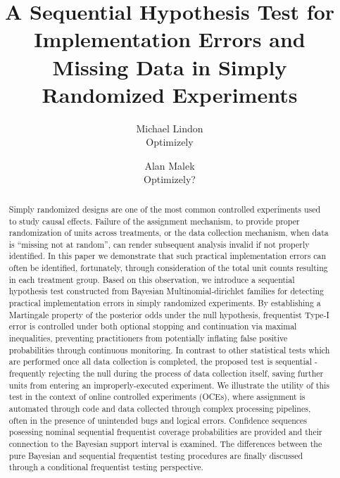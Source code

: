 \documentclass[11pt]{article}
\begin{document}
\vspace{-1in}
\title{A Sequential Hypothesis Test for Implementation Errors and Missing Data in Simply Randomized Experiments}
\author{\Large Michael Lindon \\ Optimizely \and Alan Malek \\ Optimizely?}
\maketitle 
\begin{abstract}
  Simply randomized designs are one of the most common controlled experiments used to study causal effects.
  Failure of the assignment mechanism, to provide proper randomization of units across treatments, or the data collection mechanism, when data is ``missing not at random'', can render subsequent analysis invalid if not properly identified. In this paper we demonstrate that such practical implementation errors can often be identified, fortunately, through consideration of the total unit counts resulting in each treatment group.
  Based on this observation, we introduce a sequential hypothesis test constructed from Bayesian Multinomial-dirichlet families for detecting practical implementation errors in simply randomized experiments. By establishing a Martingale property of the posterior odds under the null hypothesis, frequentist Type-I error is controlled under both optional stopping and continuation via maximal inequalities, preventing practitioners from potentially inflating false positive probabilities through continuous monitoring.
  In contrast to other statistical tests which are performed once all data collection is completed, the proposed test is sequential - frequently rejecting the null during the process of data collection itself, saving further units from entering an improperly-executed experiment.
  We illustrate the utility of this test in the context of online controlled experiments (OCEs), where assignment is automated through code and data collected through complex processing pipelines, often in the presence of unintended bugs and logical errors. Confidence sequences posessing nominal sequential frequentist coverage probabilities are provided and their connection to the Bayesian support interval is examined. The differences between the pure Bayesian and sequential frequentist testing procedures are finally discussed through a conditional frequentist testing perspective.  
\end{abstract}
\end{document}
